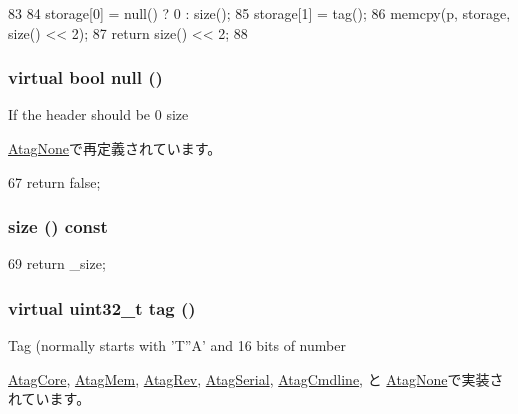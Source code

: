 \begin{DoxyCode}
83     {
84         storage[0] = null() ? 0 : size();
85         storage[1] = tag();
86         memcpy(p, storage, size() << 2);
87         return size() << 2;
88     }
\end{DoxyCode}
\hypertarget{classAtagHeader_a4af1ca4124e0ed6600fa7b8093eba309}{
\subsubsection[{null}]{\setlength{\rightskip}{0pt plus 5cm}virtual bool null ()}}
\label{classAtagHeader_a4af1ca4124e0ed6600fa7b8093eba309}
If the header should be 0 size 

\hyperlink{classAtagNone_a4af1ca4124e0ed6600fa7b8093eba309}{AtagNone}で再定義されています。


\begin{DoxyCode}
67 { return false; }
\end{DoxyCode}
\hypertarget{classAtagHeader_a213614ba4a6ad67fa2743a987609ca18}{
\subsubsection[{size}]{ size () const}}
\label{classAtagHeader_a213614ba4a6ad67fa2743a987609ca18}



\begin{DoxyCode}
69 { return _size; }
\end{DoxyCode}
\hypertarget{classAtagHeader_adad80b4c3e973afddab9e70f05faecd9}{
\subsubsection[{tag}]{\setlength{\rightskip}{0pt plus 5cm}virtual {\bf uint32\_\-t} tag ()}}
\label{classAtagHeader_adad80b4c3e973afddab9e70f05faecd9}
Tag (normally starts with 'T''A' and 16 bits of number 

\hyperlink{classAtagCore_afe29fbb80b1d2765e37e98c6d259ea52}{AtagCore}, \hyperlink{classAtagMem_afe29fbb80b1d2765e37e98c6d259ea52}{AtagMem}, \hyperlink{classAtagRev_afe29fbb80b1d2765e37e98c6d259ea52}{AtagRev}, \hyperlink{classAtagSerial_afe29fbb80b1d2765e37e98c6d259ea52}{AtagSerial}, \hyperlink{classAtagCmdline_afe29fbb80b1d2765e37e98c6d259ea52}{AtagCmdline}, と \hyperlink{classAtagNone_afe29fbb80b1d2765e37e98c6d259ea52}{AtagNone}で実装されています。

